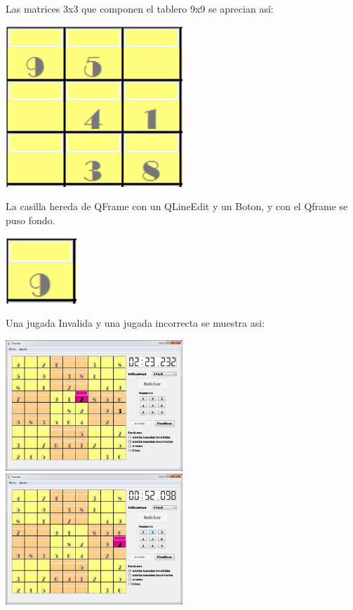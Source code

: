 \documentclass[12pt,oneside]{book}
\begin{document}
\begin{center}
	Las matrices 3x3 que componen el tablero 9x9 se aprecian así:

	\includegraphics[width=0.5\textwidth]{./imagenes/cuadr9x9.png}

	La casilla hereda de QFrame con un QLineEdit y un Boton, y con el Qframe se puso fondo. 

	\includegraphics[width=0.2\textwidth]{./imagenes/Casilla.png}

	Una jugada Invalida y una jugada incorrecta se muestra asi:

	\includegraphics[width=0.5\textwidth]{./imagenes/jugada_incorrecta.png}
	\includegraphics[width=0.5\textwidth]{./imagenes/jugada_invalida.png}


\end{center}
\end{document}
